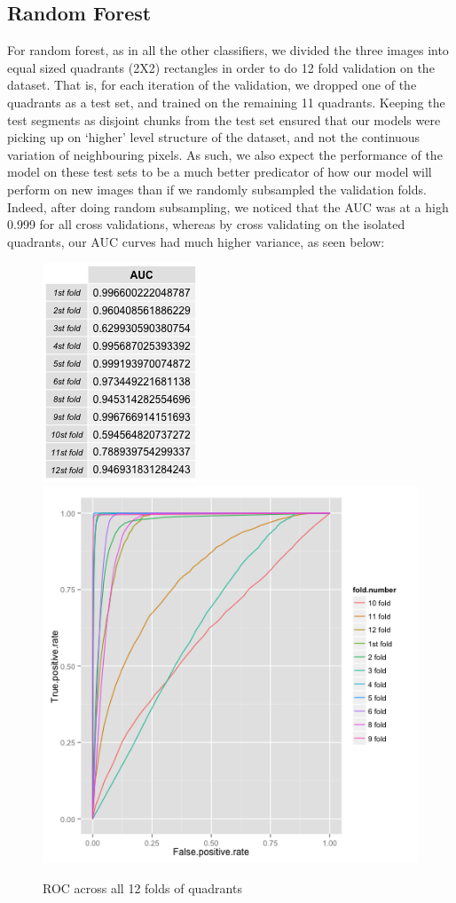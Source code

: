 \documentclass{article}\usepackage[]{graphicx}\usepackage[]{color}
\begin{document}
\subsection{Random Forest}

For random forest, as in all the other classifiers, we divided the three images into equal sized quadrants (2X2) rectangles in order to do 12 fold validation on the dataset.  That is, for each iteration of the validation, we dropped one of the quadrants as a test set, and trained on the remaining 11 quadrants.  Keeping the test segments as disjoint chunks from the test set ensured that our models were picking up on `higher' level structure of the dataset, and not the continuous variation of neighbouring pixels.  As such, we also expect the performance of the model on these test sets to be a much better predicator of how our model will perform on new images than if we randomly subsampled the validation folds.  Indeed, after doing random subsampling, we noticed that the AUC was at a high 0.999 for all cross validations, whereas by cross validating on the isolated quadrants, our AUC curves had much higher variance, as seen below: \\

\begin{figure}[H]
  \includegraphics[width=\linewidth, height = 150pts]{AUC_12_folds.png}
\endminipage\hfill
{}%
  \includegraphics[width=\linewidth, height = 150pts]{ROC_fold_comparison.png}
\endminipage
  \caption{ROC across all 12 folds of quadrants}\label{}
\end{figure}
\end{document}
